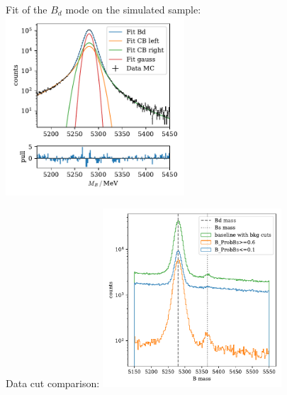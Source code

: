 \documentclass[aspectratio=1610, 10pt]{beamer}
\begin{document}
\begin{frame}{Fit of the $B_d$ mode on the simulated sample:}
  \centering
  \includegraphics[width=0.5\textwidth]{images/fit_mc.pdf}
\end{frame}

\begin{frame}{Data cut comparison:}
  \centering
  \includegraphics[width=0.5\textwidth]{images/backup/data_cut_comparison.pdf}
\end{frame}
\end{document}
